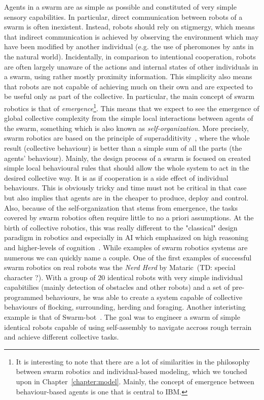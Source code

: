     Agents in a swarm are as simple as possible and constituted of very simple sensory capabilities. In particular, direct communication between robots of a swarm is often inexistent. Instead, robots should rely on stigmergy, which means that indirect communication is achieved by observing the environment which may have been modified by another individual (e.g. the use of pheromones by ants in the natural world). Incidentally, in comparison to intentional cooperation, robots are often largely unaware of the actions and internal states of other individuals in a swarm, using rather mostly proximity information. This simplicity also means that robots are not capable of achieving much on their own and are expected to be useful only as part of the collective. In particular, the main concept of swarm robotics is that of \emph{emergence}\footnote{It is interesting to note that there are a lot of similarities in the philosophy between swarm robotics and individual-based modeling, which we touched upon in Chapter~\ref{chapter:model}. Mainly, the concept of emergence between behaviour-based agents is one that is central to IBM.}. This means that we expect to see the emergence of global collective complexity from the simple local interactions between agents of the swarm, something which is also known as \emph{self-organization}. More precisely, swarm robotics are based on the principle of superadditivity~\parencite{Parker2008}, where the whole result (collective behaviour) is better than a simple sum of all the parts (the agents' behaviour). Mainly, the design process of a swarm is focused on created simple local behavioural rules that should allow the whole system to act in the desired collective way. It is as if cooperation is a side effect of individual behaviours. This is obviously tricky and time must not be critical in that case but also implies that agents are in the cheaper to produce, deploy and control. Also, because of the self-organization that stems from emergence, the tasks covered by swarm robotics often require little to no a priori assumptions. At the birth of collective robotics, this was really different to the "classical" design paradigm in robotics and especially in AI which emphasized on high reasoning and higher-levels of cognition~\parencite{Bonabeau1999}. While examples of swarm robotics systems are numerous we can quickly name a couple. One of the first examples of successful swarm robotics on real robots was the \emph{Nerd Herd} by Mataric~\parencite{Mataric1995}(TD: special character ?). With a group of $20$ identical robots with very simple individual capabitilies (mainly detection of obstacles and other robots) and a set of pre-programmed behaviours, he was able to create a system capable of collective behaviours of flocking, surrounding, herding and foraging. Another interisting example is that of Swarm-bot~\parencite{Mondada2004, Dorigo2004, Mondada2005}. The goal was to engineer a swarm of simple identical robots capable of using self-assembly to navigate accross rough terrain and achieve different collective tasks.

